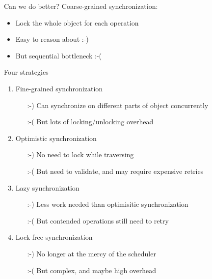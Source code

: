 \documentclass{beamer}
\begin{document}
\begin{frame}
\thispagestyle{empty}\centering
{}
\end{frame}

\begin{frame}{Can we do better?}{}
  Coarse-grained synchronization:
  \begin{itemize}
    \item Lock the whole object for each operation
      \pause
    \item Easy to reason about :-)
      \pause
    \item But sequential bottleneck :-(
  \end{itemize}
\end{frame}

\begin{frame}{Four strategies}
  \begin{enumerate}
    \item Fine-grained synchronization
      \pause
      \begin{itemize}
        \item[:-)] Can synchronize on different parts of object
          concurrently
          \pause
        \item[:-(] But lots of locking/unlocking overhead
      \end{itemize}
      \pause
    \item Optimistic synchronization
      \begin{itemize}
        \item[:-)] No need to lock while traversing
        \item[:-(] But need to validate, and may require expensive
          retries
      \end{itemize}
      \pause
    \item Lazy synchronization
      \begin{itemize}
        \item[:-)] Less work needed than optimisitic synchronization
        \item[:-(] But contended operations still need to retry
      \end{itemize}
      \pause
    \item Lock-free synchronization
      \begin{itemize}
        \item[:-)] No longer at the mercy of the scheduler
        \item[:-(] But complex, and maybe high overhead
      \end{itemize}
  \end{enumerate}
\end{frame}
\end{document}
